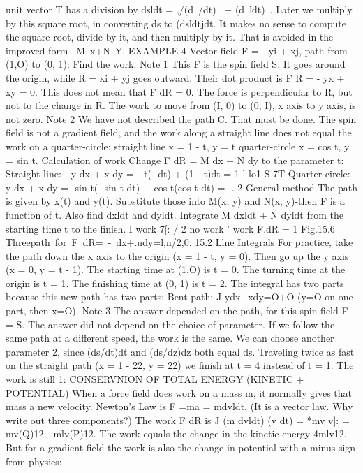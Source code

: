 unit vector T has a division by dsldt = ,/(d~/dt)~ + (d~ldt)~. Later we multiply by this
square root, in converting ds to (dsldtjdt. It makes no sense to compute the square
root, divide by it, and then multiply by it. That is avoided in the improved form
~M~x+N~Y.
EXAMPLE 4 Vector field F = - yi + xj, path from (1,O) to (0, 1): Find the work.
Note 1 This F is the spin field S. It goes around the origin, while R = xi + yj goes
outward. Their dot product is F R = - yx + xy = 0. This does not mean that
F dR = 0. The force is perpendicular to R, but not to the change in R. The work to
move from (I, 0) to (0, I), x axis to y axis, is not zero.
Note 2 We have not described the path C. That must be done. The spin field is not
a gradient field, and the work along a straight line does not equal the work on a
quarter-circle:
straight line x = 1 - t, y = t quarter-circle x = cos t, y = sin t.
Calculation of work Change F dR = M dx + N dy to the parameter t:
Straight line: - y dx + x dy = - t(- dt) + (1 - t)dt = 1 l lo1
S 7T
Quarter-circle: - y dx + x dy = -sin t(- sin t dt) + cos t(cos t dt) = -. 2
General method The path is given by x(t) and y(t). Substitute those into M(x, y)
and N(x, y)-then F is a function of t. Also find dxldt and dyldt. Integrate
M dxldt + N dyldt from the starting time t to the finish.
I work 7[: / 2 no work ' work F.dR = 1
Fig.15.6 Threepath~for~F~dR=~-~dx+.udy=l,n/2,0. 
15.2 Llne Integrals
For practice, take the path down the x axis to the origin (x = 1 - t, y = 0). Then
go up the y axis (x = 0, y = t - 1). The starting time at (1,O) is t = 0. The turning time
at the origin is t = 1. The finishing time at (0, 1) is t = 2. The integral has two parts
because this new path has two parts:
Bent path: J-ydx+xdy=O+O (y=O on one part, then x=O).
Note 3 The answer depended on the path, for this spin field F = S. The answer did
not depend on the choice of parameter. If we follow the same path at a different
speed, the work is the same. We can choose another parameter 2, since (ds/dt)dt and
(ds/dz)dz both equal ds. Traveling twice as fast on the straight path (x = 1 - 22,
y = 22) we finish at t = 4 instead of t = 1. The work is still 1:
CONSERVNION OF TOTAL ENERGY (KINETIC + POTENTIAL)
When a force field does work on a mass m, it normally gives that mass a new velocity.
Newton's Law is F =ma = mdvldt. (It is a vector law. Why write out three components?)
The work F dR is
J (m dvldt) (v dt) = *mv v]: = mv(Q)12 - mlv(P)12.
The work equals the change in the kinetic energy 4mlv12. But for a gradient field the
work is also the change in potential-with a minus sign from physics:
